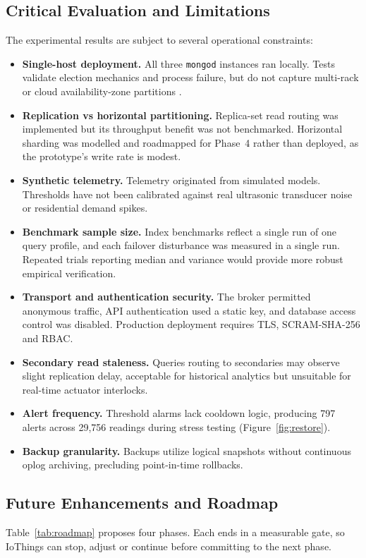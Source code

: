 \documentclass[11pt,a4paper]{article}
\begin{document}
\subsection{Critical Evaluation and Limitations}\label{sec:limits}
The experimental results are subject to several operational constraints:
\begin{itemize}[noitemsep]
\item \textbf{Single-host deployment.} All three \texttt{mongod} instances ran locally. Tests validate election mechanics and process failure, but do not capture multi-rack or cloud availability-zone partitions \citep{mongoRepl}.
\item \textbf{Replication vs horizontal partitioning.} Replica-set read routing was implemented but its throughput benefit was not benchmarked. Horizontal sharding was modelled and roadmapped for Phase~4 rather than deployed, as the prototype's write rate is modest.
\item \textbf{Synthetic telemetry.} Telemetry originated from simulated models. Thresholds have not been calibrated against real ultrasonic transducer noise or residential demand spikes.
\item \textbf{Benchmark sample size.} Index benchmarks reflect a single run of one query profile, and each failover disturbance was measured in a single run. Repeated trials reporting median and variance would provide more robust empirical verification.
\item \textbf{Transport and authentication security.} The broker permitted anonymous traffic, API authentication used a static key, and database access control was disabled. Production deployment requires TLS, SCRAM-SHA-256 and RBAC.
\item \textbf{Secondary read staleness.} Queries routing to secondaries may observe slight replication delay, acceptable for historical analytics but unsuitable for real-time actuator interlocks.
\item \textbf{Alert frequency.} Threshold alarms lack cooldown logic, producing 797 alerts across 29,756 readings during stress testing (Figure~\ref{fig:restore}).
\item \textbf{Backup granularity.} Backups utilize logical snapshots without continuous oplog archiving, precluding point-in-time rollbacks.
\end{itemize}

\subsection{Future Enhancements and Roadmap}
Table~\ref{tab:roadmap} proposes four phases. Each ends in a measurable gate, so IoThings can stop, adjust or continue before committing to the next phase.
\end{document}
